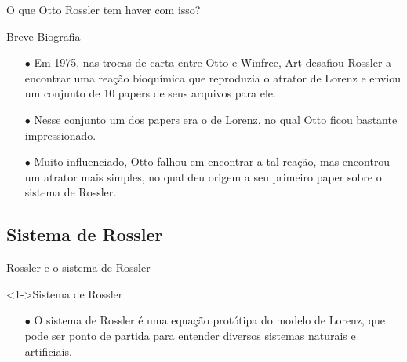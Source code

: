 \documentclass{beamer}
\begin{document}
\begin{frame}{O que Otto Rossler tem haver com isso?}
	
	\begin{exampleblock}{Breve Biografia}
		\begin{itemize}
			\item [$\bullet$] Em 1975, nas trocas de carta entre Otto e Winfree, Art desafiou Rossler a encontrar uma reação bioquímica que reproduzia o atrator de Lorenz e enviou um conjunto de 10 papers de seus arquivos para ele.
			
			\item [$\bullet$] Nesse conjunto um dos papers era o de Lorenz, no qual Otto ficou bastante impressionado.
			
			\item [$\bullet$] Muito influenciado, Otto falhou em encontrar a tal reação, mas encontrou um atrator mais simples, no qual deu origem a seu primeiro paper sobre o sistema de Rossler.
		\end{itemize}
	\end{exampleblock}
\end{frame}

\subsection{Sistema de Rossler}
\begin{frame}{Rossler e o sistema de Rossler}
    \begin{exampleblock}
	     <1->{Sistema de Rossler}
             \begin{itemize}
                 \item [$\bullet$] O sistema de Rossler é uma equação protótipa do modelo de Lorenz, que pode ser ponto de partida para entender diversos sistemas naturais e artificiais.                     
			\end{itemize}
	\end{exampleblock}
\end{frame}

\end{document}
